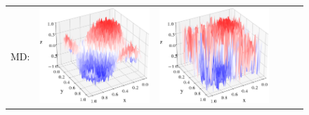 \documentclass[12pt, reqno]{report}
\theoremstyle{definition}
\theoremstyle{remark}
\begin{document}
\begin{figure}[H]
\begin{tabular}{rccccc}
        MD: &
        \includegraphics[align = c, height=\subheight]{media_paper/AC_surf_MD_n=0.png} &
        \includegraphics[align = c, height=\subheight]{media_paper/AC_surf_MD_n=50.png} &

\end{tabular}
\end{figure}
\end{document}
